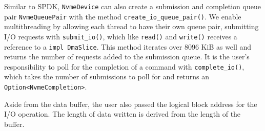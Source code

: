 Similar to SPDK, \texttt{NvmeDevice} can also create a submission and completion queue pair \texttt{NvmeQueuePair} with the method \texttt{create\_io\_queue\_pair()}. We enable multithreading by allowing each thread to have their own queue pair, submitting I/O requests with \texttt{submit\_io()}, which like \texttt{read()} and \texttt{write()} receives a reference to a \texttt{impl DmaSlice}. This method iterates over 8096 KiB as well and returns the number of requests added to the submission queue. It is the user's responsibility to poll for the completion of a command with \texttt{complete\_io()}, which takes the number of submissions to poll for and returns an \texttt{Option<NvmeCompletion>}.

Aside from the data buffer, the user also passed the logical block address for the I/O operation. The length of data written is derived from the length of the buffer.
